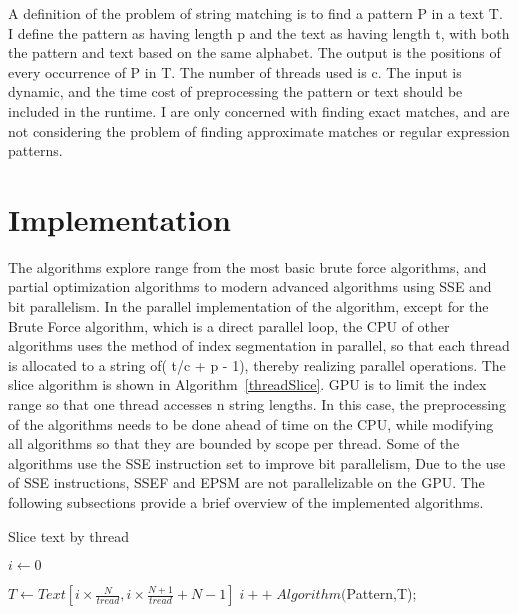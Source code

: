 \documentclass[11pt]{article}       %
\begin{document}
A definition of the problem of string matching is to find a pattern P in a text T.  I define the pattern as having length p and the text as having length t, with both the pattern and text based on the same alphabet. The output is the positions of every occurrence of P in T. The number of threads used is c. The input is dynamic, and the time cost of preprocessing the pattern or text should be included in the runtime. I are only concerned with finding exact matches, and are not considering the problem of finding approximate matches or regular expression patterns.





\section{Implementation} \label{proposedSolution}

The algorithms explore range from the most basic brute force algorithms, and partial optimization algorithms to modern advanced algorithms using SSE and bit parallelism. In the parallel implementation of the algorithm, except for the Brute Force algorithm, which is a direct parallel loop, the CPU of other algorithms uses the method of index segmentation in parallel, so that each thread is allocated to a string of( t/c + p - 1), thereby realizing parallel operations. The slice algorithm is shown in Algorithm~\ref{threadSlice}. GPU is to limit the index range so that one thread accesses n string lengths. In this case, the preprocessing of the algorithms needs to be done ahead of time on the CPU, while modifying all algorithms so that they are bounded by scope per thread. Some of the algorithms use the SSE instruction set to improve bit parallelism, Due to the use of SSE instructions, SSEF and EPSM are not parallelizable on the GPU. The following subsections provide a brief overview of the implemented algorithms.




\begin{algorithm}[hbt!]
\caption{Slice text by thread}\label{threadSlice}
$i \gets 0$\;
   { 
  $T \gets Text[i \times \frac{N}{tread}, i \times \frac{N+1}{tread} + N - 1]\;
  
  i++\;
  Algorithm($Pattern,T);
  
 }
\end{algorithm}
\end{document}
